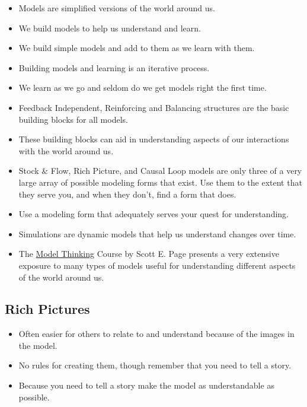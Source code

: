 \documentclass[]{memoir}
\begin{document}
\begin{itemize}
\itemsep1pt\parskip0pt
\item
  Models are simplified versions of the world around us.
\item
  We build models to help us understand and learn.
\item
  We build simple models and add to them as we learn with them.
\item
  Building models and learning is an iterative process.
\item
  We learn as we go and seldom do we get models right the first time.
\item
  Feedback Independent, Reinforcing and Balancing structures are the
  basic building blocks for all models.
\item
  These building blocks can aid in understanding aspects of our
  interactions with the world around us.
\item
  Stock \& Flow, Rich Picture, and Causal Loop models are only three of
  a very large array of possible modeling forms that exist. Use them to
  the extent that they serve you, and when they don't, find a form that
  does.
\item
  Use a modeling form that adequately serves your quest for
  understanding.
\item
  Simulations are dynamic models that help us understand changes over
  time.
\item
  The \href{https://www.coursera.org/course/modelthinking}{Model
  Thinking} Course by Scott E. Page presents a very extensive exposure
  to many types of models useful for understanding different aspects of
  the world around us.
\end{itemize}

\subsection{Rich Pictures}

\begin{itemize}
\itemsep1pt\parskip0pt
\item
  Often easier for others to relate to and understand because of the
  images in the model.
\item
  No rules for creating them, though remember that you need to tell a
  story.
\item
  Because you need to tell a story make the model as understandable as
  possible.
\end{itemize}
\end{document}
